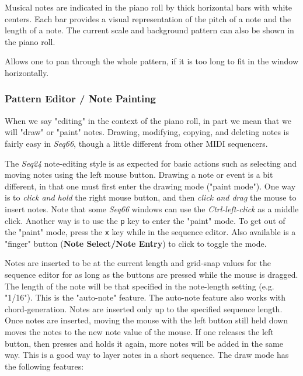    Musical notes are indicated in the piano roll
   by thick horizontal bars with white
   centers.  Each bar provides
   a visual representation of the pitch of a note and the length of a note.
   The current scale and background pattern can also be shown in the piano
   roll.

   Allows one to pan through the whole pattern, if it is too long to fit in
   the window horizontally.

\subsubsection{Pattern Editor / Note Painting}
\label{subsubsec:pattern_editor_note_painting}

   When we say "editing" in the context of the piano roll, in part we mean that
   we will "draw"
   or "paint" notes.
   Drawing, modifying, copying, and deleting notes is fairly easy in
   \textsl{Seq66}, though a little different from other MIDI sequencers.

   The \textsl{Seq24} note-editing style is as expected for basic
   actions such as selecting and moving notes using the left mouse button.
   Drawing a note or event is a bit different, in that one must first
   enter the drawing mode ("paint mode").
   One way is to \textsl{click and hold} the right mouse button, and then
   \textsl{click and drag} the mouse to insert notes.
   Note that some \textsl{Seq66} windows
   can use the \textsl{Ctrl-left-click} as a middle click. 
   Another way is to use the \texttt{p} key to enter the "paint" mode.
   To get out of the "paint" mode, press the
   \texttt{x} key while in the sequence editor.
   Also available is a "finger" button
   (\textbf{Note Select/Note Entry})
   to click to toggle the mode.

   Notes are inserted to be at the current length and grid-snap values for
   the sequence editor for as long as the buttons are pressed while the mouse
   is dragged.
   The length of the note will
   be that specified in the note-length setting (e.g. "1/16").
   This is the "auto-note" feature.
   The auto-note feature also works with chord-generation.
   Notes are inserted only up to the specified sequence length.
   Once notes are inserted, moving the mouse with the left button still
   held down moves the notes to the new note value of the mouse.
   If one releases the left button, then presses and holds it again,
   more notes will be added in the same way.
   This is a good way to layer notes in a short sequence.
   The draw mode has the following features:

